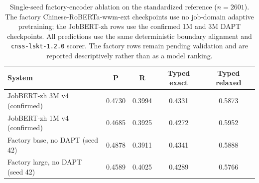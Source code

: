 \begin{table}[htbp]
\centering
\small
\caption{Single-seed factory-encoder ablation on the standardized reference ($n{=}2601$). The factory Chinese-RoBERTa-wwm-ext checkpoints use no job-domain adaptive pretraining; the JobBERT-zh rows use the confirmed 1M and 3M DAPT checkpoints. All predictions use the same deterministic boundary alignment and \texttt{cnss-lskt-1.2.0} scorer. The factory rows remain pending validation and are reported descriptively rather than as a model ranking.}
\label{tab:vanilla-wwm-v4}
\begin{tabular}{lcccc}
\toprule
\textbf{System} & \textbf{P} & \textbf{R} & \textbf{Typed exact} & \textbf{Typed relaxed} \\
\midrule
JobBERT-zh 3M v4 (confirmed) & 0.4730 & 0.3994 & 0.4331 & 0.5873 \\
JobBERT-zh 1M v4 (confirmed) & 0.4685 & 0.3925 & 0.4272 & 0.5952 \\
Factory base, no DAPT (seed 42) & 0.4878 & 0.3911 & 0.4341 & 0.5888 \\
Factory large, no DAPT (seed 42) & 0.4589 & 0.4025 & 0.4289 & 0.5766 \\
\bottomrule
\end{tabular}
\end{table}
